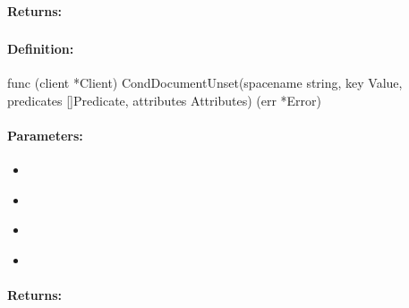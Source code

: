 \paragraph{Returns:}


\pagebreak
\subsubsection{}
\label{api:Go:CondDocumentUnset}


\paragraph{Definition:}
\begin{gocode}
func (client *Client) CondDocumentUnset(spacename string, key Value, predicates []Predicate, attributes Attributes) (err *Error)
\end{gocode}

\paragraph{Parameters:}
\begin{itemize}[noitemsep]
\item {}\\

\item {}\\

\item {}\\

\item {}\\

\end{itemize}

\paragraph{Returns:}


\pagebreak
\subsubsection{}
\label{api:Go:GroupDocumentUnset}


